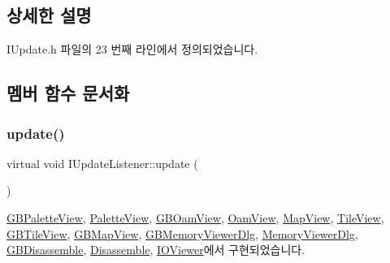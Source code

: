 \subsection{상세한 설명}


I\+Update.\+h 파일의 23 번째 라인에서 정의되었습니다.



\subsection{멤버 함수 문서화}
\mbox{\label{class_i_update_listener_ac03b85f52e858d0bbd08a4984b2cb929}} 
\subsubsection{\texorpdfstring{update()}{update()}}
{\footnotesize\ttfamily virtual void I\+Update\+Listener\+::update (\begin{DoxyParamCaption}{ }\end{DoxyParamCaption})\hspace{0.3cm}{\ttfamily [pure virtual]}}



\mbox{\hyperlink{class_g_b_palette_view_a43a43edd82e080e860aeb6a82ec106fc}{G\+B\+Palette\+View}}, \mbox{\hyperlink{class_palette_view_a94549cb400d23e790497c4263bf1e09b}{Palette\+View}}, \mbox{\hyperlink{class_g_b_oam_view_a4e4dc00c48996d9fb2dc1169b65b4cc8}{G\+B\+Oam\+View}}, \mbox{\hyperlink{class_oam_view_a9a54cb2672c3302524a00b744d09b645}{Oam\+View}}, \mbox{\hyperlink{class_map_view_ac41eb53f60bccbfe4f5601f1a997c51e}{Map\+View}}, \mbox{\hyperlink{class_tile_view_a09b04d6b0135ef2b6da3c08796c1d354}{Tile\+View}}, \mbox{\hyperlink{class_g_b_tile_view_a0b36c27b43fea0e457a26860b2476b9d}{G\+B\+Tile\+View}}, \mbox{\hyperlink{class_g_b_map_view_af907981b2a105364f52d9fc11030a200}{G\+B\+Map\+View}}, \mbox{\hyperlink{class_g_b_memory_viewer_dlg_acb02578600a9ecd38ac653306241089b}{G\+B\+Memory\+Viewer\+Dlg}}, \mbox{\hyperlink{class_memory_viewer_dlg_a0222a6beddfef071bc19b8849dc4ee15}{Memory\+Viewer\+Dlg}}, \mbox{\hyperlink{class_g_b_disassemble_a1170fe51e14d0b770f5200bf4e193423}{G\+B\+Disassemble}}, \mbox{\hyperlink{class_disassemble_a30fc26e4204bd886f7cd8eb0c6c22e88}{Disassemble}}, \mbox{\hyperlink{class_i_o_viewer_a500c8fc593280ff95977fb59293b6ab6}{I\+O\+Viewer}}에서 구현되었습니다.

